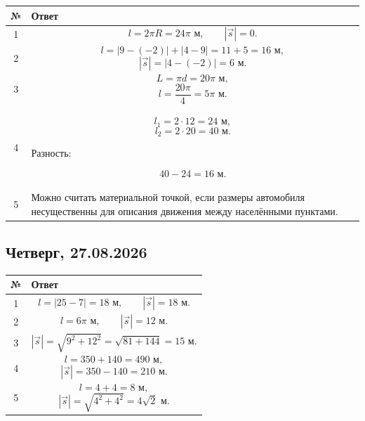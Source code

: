 \documentclass[a4paper,12pt]{article}
\begin{document}
\begin{center}
\renewcommand{\arraystretch}{1.35}

\begin{tabularx}{\linewidth}{@{}cX@{}}
\toprule
№ & Ответ\\
\midrule

1 &
\[
l=2\pi R=24\pi\text{ м},
\qquad
|\vec{s}|=0.
\]
\\

2 &
\[
l=
|9-(-2)|+|4-9|
=
11+5
=
16\text{ м},
\]
\[
|\vec{s}|=
|4-(-2)|
=
6\text{ м}.
\]
\\

3 &
\[
L=\pi d=20\pi\text{ м},
\]
\[
l=\frac{20\pi}{4}
=
5\pi\text{ м}.
\]
\\

4 &
\[
l_1=2\cdot12=24\text{ м},
\]
\[
l_2=2\cdot20=40\text{ м}.
\]

Разность:

\[
40-24=16\text{ м}.
\]
\\

5 &
Можно считать материальной точкой,
если размеры автомобиля несущественны
для описания движения между населёнными пунктами.\\

\bottomrule
\end{tabularx}
\end{center}


\subsection*{\textcolor{darkaccent}{Четверг, 27.08.2026}}

\begin{center}
\renewcommand{\arraystretch}{1.35}

\begin{tabularx}{\linewidth}{@{}cX@{}}
\toprule
№ & Ответ\\
\midrule

1 &
\[
l=
|25-7|
=
18\text{ м},
\qquad
|\vec{s}|=18\text{ м}.
\]
\\

2 &
\[
l=6\pi\text{ м},
\qquad
|\vec{s}|=12\text{ м}.
\]
\\

3 &
\[
|\vec{s}|
=
\sqrt{9^2+12^2}
=
\sqrt{81+144}
=
15\text{ м}.
\]
\\

4 &
\[
l=350+140=490\text{ м},
\]
\[
|\vec{s}|=350-140=210\text{ м}.
\]
\\

5 &
\[
l=4+4=8\text{ м},
\]
\[
|\vec{s}|
=
\sqrt{4^2+4^2}
=
4\sqrt{2}\text{ м}.
\]
\\

\bottomrule
\end{tabularx}
\end{center}
\end{document}
